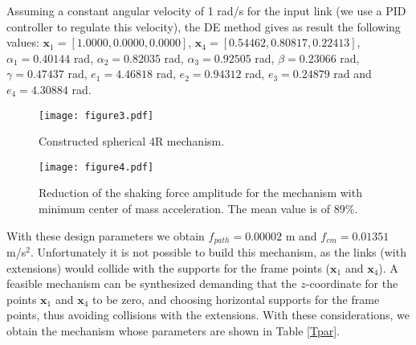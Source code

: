 \documentclass[11pt]{article}
\begin{document}
Assuming a constant angular velocity of 1 rad/s for the input link (we 
use a PID controller to regulate this velocity), the DE method gives as 
result the following values: 
$ \mathbf{x}_1 = [ 1.0000 , 0.0000, 0.0000]$, 
$ \mathbf{x}_4 = [0.54462, 0.80817, 0.22413]$,
$\alpha_1=0.40144$ rad,
$\alpha_2=0.82035$ rad,
$\alpha_3=0.92505$ rad, 
$ \beta = 0.23066$ rad,
$ \gamma = 0.47437$ rad,
$ e_1  = 4.46818$ rad,
$ e_2  = 0.94312$ rad,
$ e_3  = 0.24879$ rad and
$ e_4  = 4.30884$ rad.
\begin{table}[htb]
\caption{\label{Tpar} Parameters of the constructed spherical 4R 
mechanism.}
\vspace*{0.1cm}
\centering
{}
\end{table} 
\begin{figure}[htb]
\begin{center}
\texttt{[image: figure3.pdf]} 
\caption{Constructed spherical 4R mechanism. }
\label{figure3}
\end{center}
\end{figure}
\begin{figure}[htb]
\begin{center}
\texttt{[image: figure4.pdf]} 
\caption{Reduction of the shaking force amplitude for the mechanism with 
minimum center of mass acceleration. The mean value is of 89\%. }
\label{figure4}
\end{center}
\end{figure}
With these design parameters we obtain $f_{path}=0.00002$ m and 
$f_{cm}=0.01351$ m/s$^2$.  Unfortunately it is not possible to build 
this mechanism, as the links (with extensions) would collide with the 
supports for the frame points ($\mathbf{x}_1$ and $\mathbf{x}_4$). A 
feasible mechanism can be synthesized demanding that the $z$-coordinate 
for the points  $\mathbf{x}_1$ and $\mathbf{x}_4$ to be zero, and 
choosing horizontal supports for the frame points, thus avoiding 
collisions with the extensions. With these considerations, we  obtain 
the mechanism whose parameters are shown in Table \ref{Tpar}. 
\end{document}
